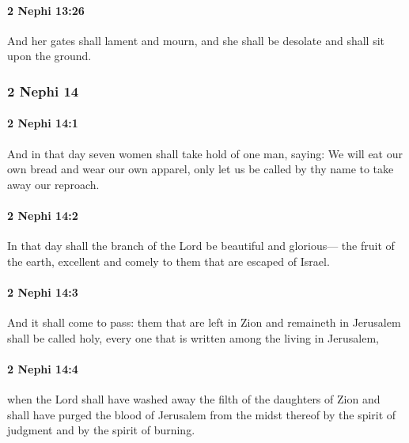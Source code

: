		\paragraph{2 Nephi 13:26} %
			\label{2NEPHI-13-26}

			And her gates shall lament and mourn,
			and she shall be desolate and shall sit upon the ground.

	\subsubsection{2 Nephi 14} %
		\label{2NEPHI-14}
		
		\paragraph{2 Nephi 14:1} %
			\label{2NEPHI-14-1}

			And in that day seven women shall take hold of one man, saying:
			We will eat our own bread and wear our own apparel,
			only let us be called by thy name to take away our reproach.

		\paragraph{2 Nephi 14:2} %
			\label{2NEPHI-14-2}

			In that day shall the branch of the Lord be beautiful and glorious---
			the fruit of the earth, excellent and comely to them that are escaped of Israel.

		\paragraph{2 Nephi 14:3} %
			\label{2NEPHI-14-3}

			And it shall come to pass:
			them that are left in Zion and remaineth in Jerusalem shall be called holy,
			every one that is written among the living in Jerusalem,

		\paragraph{2 Nephi 14:4} %
			\label{2NEPHI-14-4}

			when the Lord shall have washed away the filth of the daughters of Zion
			and shall have purged the blood of Jerusalem from the midst thereof
			by the spirit of judgment and by the spirit of burning.

